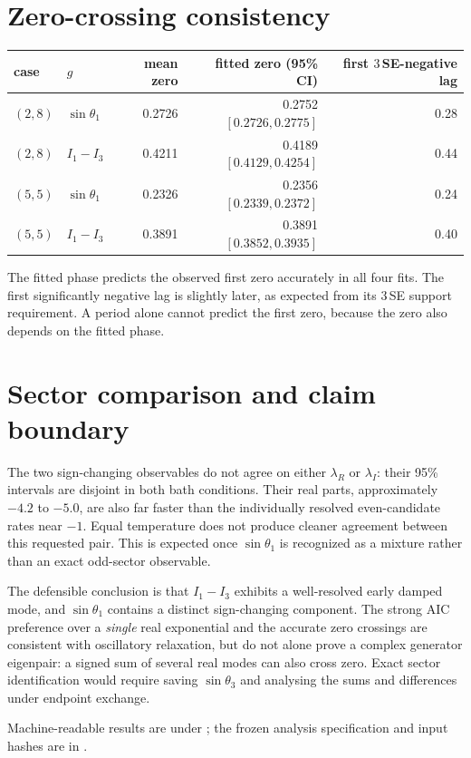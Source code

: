 \documentclass[11pt]{article}
\begin{document}
\section*{Zero-crossing consistency}
\begin{table}[h]
\centering\small
\begin{tabular}{llrrr}
\toprule
case & $g$ & mean zero & fitted zero (95\% CI) & first $3\,$SE-negative lag\\
\midrule
$(2,8)$ & $\sin\theta_1$ & 0.2726 & 0.2752 $[0.2726,0.2775]$ & 0.28\\
$(2,8)$ & $I_1-I_3$ & 0.4211 & 0.4189 $[0.4129,0.4254]$ & 0.44\\
$(5,5)$ & $\sin\theta_1$ & 0.2326 & 0.2356 $[0.2339,0.2372]$ & 0.24\\
$(5,5)$ & $I_1-I_3$ & 0.3891 & 0.3891 $[0.3852,0.3935]$ & 0.40\\
\bottomrule
\end{tabular}
\end{table}
The fitted phase predicts the observed first zero accurately in all four fits.
The first significantly negative lag is slightly later, as expected from its
$3\,$SE support requirement. A period alone cannot predict the first zero,
because the zero also depends on the fitted phase.

\section*{Sector comparison and claim boundary}
The two sign-changing observables do not agree on either $\lambda_R$ or
$\lambda_I$: their 95\% intervals are disjoint in both bath conditions. Their
real parts, approximately $-4.2$ to $-5.0$, are also far faster than the
individually resolved even-candidate rates near $-1$. Equal temperature does
not produce cleaner agreement between this requested pair. This is expected
once $\sin\theta_1$ is recognized as a mixture rather than an exact odd-sector
observable.

The defensible conclusion is that $I_1-I_3$ exhibits a well-resolved early
damped mode, and $\sin\theta_1$ contains a distinct sign-changing component.
The strong AIC preference over a \emph{single} real exponential and the
accurate zero crossings are consistent with oscillatory relaxation, but do not
alone prove a complex generator eigenpair: a signed sum of several real modes
can also cross zero. Exact sector identification would require saving
$\sin\theta_3$ and analysing the sums and differences under endpoint exchange.

Machine-readable results are under ; the frozen
analysis specification and input hashes are in
.
\end{document}
